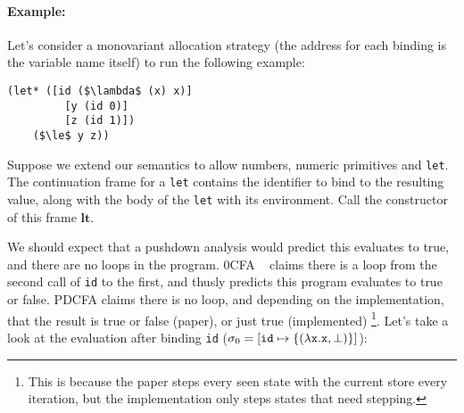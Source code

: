 \paragraph{Example:} Let's consider a monovariant allocation strategy (the address for each binding is the variable name itself) to run the following example:
\begin{lstlisting}[mathescape]
  (let* ([id ($\lambda$ (x) x)]
         [y (id 0)]
         [z (id 1)])
    ($\le$ y z))
\end{lstlisting}
Suppose we extend our semantics to allow numbers, numeric primitives and \texttt{let}.
%
The continuation frame for a \texttt{let} contains the identifier to bind to the resulting value, along with the body of the \texttt{let} with its environment.
%
Call the constructor of this frame $\mathbf{lt}$.

We should expect that a pushdown analysis would predict this evaluates to true, and there are no loops in the program.
%
0CFA ~\citep{ianjohnson:Shivers:1991:CFA} claims there is a loop from the second call of \texttt{id} to the first, and thusly predicts this program evaluates to true or false.
%
PDCFA claims there is no loop, and depending on the implementation, that the result is true or false (paper), or just true (implemented)
\footnote{This is because the paper steps every seen state with the current store every iteration, but the implementation only steps states that need stepping.}.
%
Let's take a look at the evaluation after binding \texttt{id} ($\sigma_0 = [\texttt{id} \mapsto \{ (\lambda{} \texttt{x}. \texttt{x}, \bot) \}]$):


